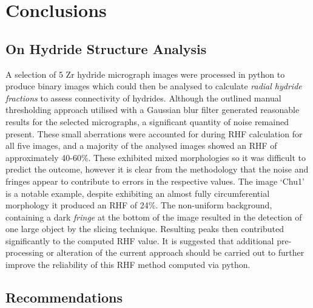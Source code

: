 \documentclass{article}
\begin{document}
\section{Conclusions}
\subsection{On Hydride Structure Analysis}
\noindent 
A selection of 5 Zr hydride micrograph images were processed in python to produce binary images which could then be analysed to calculate \textit{radial hydride fractions} to assess connectivity of hydrides. Although the outlined manual thresholding approach utilised with a Gaussian blur filter generated reasonable results for the selected micrographs, a significant quantity of noise remained present. These small aberrations were accounted for during RHF calculation for all five images, and a majority of the analysed images showed an RHF of approximately 40-60\%. These exhibited mixed morphologies so it was difficult to predict the outcome, however it is clear from the methodology that the noise and fringes appear to contribute to errors in the respective values. The image ‘Chu1’ is a notable example, despite exhibiting an almost fully circumferential morphology it produced an RHF of 24\%. The non-uniform background, containing a dark \textit{fringe} at the bottom of the image resulted in the detection of one large object by the slicing technique. Resulting peaks then contributed significantly to the computed RHF value. It is suggested that additional pre-processing or alteration of the current approach should be carried out to further improve the reliability of this RHF method computed via python.

\subsection{Recommendations}
\end{document}

